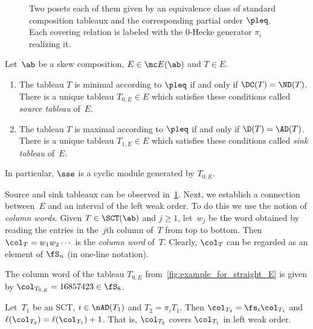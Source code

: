 \begin{figure}[htb]
{{\begin{tikzpicture}
		\end{tikzpicture} 

	}		\label{fig:example_for_skew_E}
}
		\caption{%
			Two posets each of them given by an equivalence class of standard composition tableaux and the corresponding partial order $\pleq$.
			Each covering relation is labeled with the 0-Hecke generator $\pi_i$ realizing it.
		}
		\label{fig:example_for_E}
\end{figure}
\endgroup


\begin{theo}
	\label{thm:source_and_sink_tableau}
	 Let~$\ab$ be a skew composition, $E\in \mc E(\ab)$ and $T\in E$.
	\begin{enumerate}
		\item The tableau $T$ is minimal according to $\pleq$ if and only if $\DC(T)= \ND(T)$. There is a unique tableau $T_{0,E}\in E$ which satisfies these conditions called \emph{source tableau} of~$E$.
		\item The tableau $T$ is maximal according to $\pleq$ if and only if $\D(T)= \AD(T)$. There is a unique tableau $T_{1,E}\in E$ which satisfies these conditions called \emph{sink tableau} of~$E$.
	\end{enumerate}
	In particular, $\sse$ is a cyclic module generated by $T_{0,E}$.
\end{theo}

Source and sink tableaux can be observed in~\cref{fig:example_for_E}. Next, we establish a connection between~$E$ and an interval of the left weak order. To do this we use the notion of \emph{column words}.
 Given $T\in \SCT(\ab)$ and $j\geq 1$, let~$w_j$ be the word obtained by reading the entries in the~$j$th column of~$T$ from top to bottom. Then $\col_T= w_1 w_2 \cdots$ is the \emph{column word} of~$T$. Clearly, $\col_T$ can be regarded as an element of $\fS_n$ (in one-line notation).
 
\begin{exam}
	The column word of the tableau $T_{0,E}$ from~\cref{fig:example_for_straight_E} is given by $\col_{T_{0,E}} = 16857423\in \fS_8$.
\end{exam}

\begin{lemma}
	\label{thm:tableaux_cover_impies_column_words_cover}
	Let~$T_1$ be an SCT, $i\in \nAD(T_1)$ and $T_2 = \pi_i T_1$. Then $\col_{T_2} = \fs_i \col_{T_1}$ and $\ell(\col_{T_2}) = \ell(\col_{T_1}) + 1$. That is, $\col_{T_2}$ covers $\col_{T_1}$ in left weak order.
\end{lemma}


